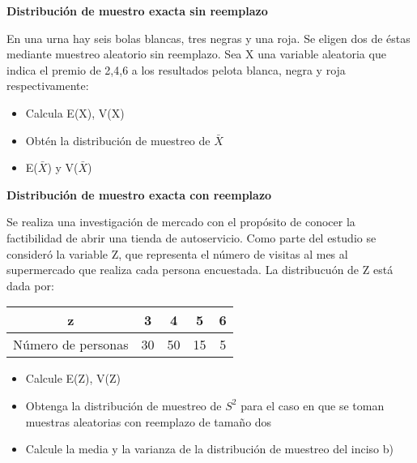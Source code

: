 \documentclass{oxmathproblems}
\begin{document}
\begin{questions}

\miquestion \textbf{Distribución de muestro exacta sin reemplazo} 

En una urna hay seis bolas blancas, tres negras y una roja. Se eligen dos de éstas mediante muestreo aleatorio sin reemplazo. Sea X una variable aleatoria que indica el premio de 2,4,6 a los resultados pelota blanca, negra y roja respectivamente:

\begin{itemize}
\item Calcula E(X), V(X)
\item Obtén la distribución de muestreo de $\bar{X}$
\item E($\bar{X}$) y V($\bar{X}$)
\end{itemize}

\miquestion \textbf{Distribución de muestro exacta con reemplazo} 

Se realiza una investigación de mercado con el propósito de conocer la factibilidad de abrir una tienda de autoservicio. Como parte del estudio se consideró la variable Z, que representa el número de visitas al mes al supermercado que realiza cada persona encuestada. La distribucuón de Z está dada por:

\begin{center}
\begin{tabular}{ |c|c|c|c|c| } 
 \hline
 \textbf{z} & \textbf{3} & \textbf{4} & \textbf{5} & \textbf{6} \\
 \hline
 Número de personas & 30 & 50 & 15 & 5  \\
 \hline
\end{tabular}
\end{center}

\begin{itemize}
\item Calcule E(Z), V(Z)
\item Obtenga la distribución de muestreo de $S^2$ para el caso en que se toman muestras aleatorias con reemplazo de tamaño dos
\item Calcule la media y la varianza de la distribución de muestreo del inciso b)
\end{itemize}

\end{questions}
\end{document}
